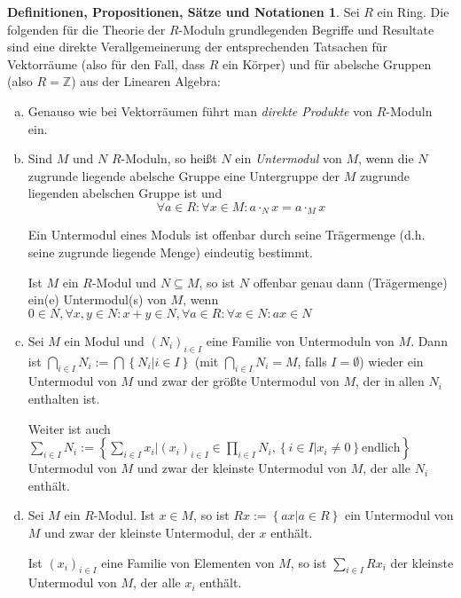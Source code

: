 \documentclass[
twoside=semi,
fontsize=12,
DIV=12, 
cleardoublepage=current,
leqno,
headings=optiontoheadandtoc, 
toc=idx
]{scrbook}
\newcommand{\Z}{\mathbb{Z}}
\newcommand{\set}[1]{\left\{ #1 \right\}}
\theoremstyle{definition}
\newtheorem{def-prop-satz-not}[definition]{Definitionen, Propositionen, S\"atze und Notationen}
\begin{document}
	\begin{def-prop-satz-not}\label{1.1.4}
		Sei $R$ ein Ring. Die folgenden f\"ur die Theorie der $R$-Moduln grundlegenden Begriffe und Resultate sind eine direkte Verallgemeinerung der entsprechenden Tatsachen f\"ur Vektorr\"aume (also f\"ur den Fall, dass $R$ ein K\"orper) und f\"ur abelsche Gruppen (also $R = \Z$) aus der Linearen Algebra:
		
		\begin{enumerate}[(a)]
			\item Genauso wie bei Vektorr\"aumen f\"uhrt man \emph{direkte Produkte} von $R$-Moduln ein.
			
			\item Sind $M$ und $N$ $R$-Moduln, so hei\ss t $N$ ein \emph{Untermodul} von $M$, wenn die $N$ zugrunde liegende abelsche Gruppe eine Untergruppe der $M$ zugrunde liegenden abelschen Gruppe ist und 
			\[\forall a \in R: \forall x \in M: a \cdot_N x = a \cdot_M x\]
			
			Ein Untermodul eines Moduls ist offenbar durch seine Tr\"agermenge (d.h. seine zugrunde liegende Menge) eindeutig bestimmt.
			
			Ist $M$ ein $R$-Modul und $N \subseteq M$, so ist $N$ offenbar genau dann (Tr\"agermenge) ein(e) Untermodul(s) von $M$, wenn $0\in N, \forall x, y\in N: x + y \in N, \forall a \in R: \forall x \in N: ax \in N$
			
			\item Sei $M$ ein Modul und $(N_i)_{i \in I}$ eine Familie von Untermoduln von $M$. Dann ist 
			$\bigcap_{i \in I} N_i := \bigcap \set{N_i | i \in I}$ (mit $\bigcap_{i \in I} N_i = M$, falls $I = \emptyset$)
			wieder ein Untermodul von $M$ und zwar der gr\"o\ss te Untermodul von $M$, der in allen $N_i$ enthalten ist.
			
			Weiter ist auch $\sum_{i \in I} N_i := \set{\sum_{i \in I} x_i | (x_i)_{i \in I} \in \prod_{i\in I} N_i, \set{i \in I| x_i \neq 0} \textrm{endlich}}$ Untermodul von $M$ und zwar der kleinste Untermodul von $M$, der alle $N_i$ enth\"alt.
			
			\item Sei $M$ ein $R$-Modul. Ist $x \in M$, so ist $Rx := \set{ax| a \in R}$ ein Untermodul von $M$ und zwar der kleinste Untermodul, der $x$ enth\"alt.
			
			Ist $(x_i)_{i \in I}$ eine Familie von Elementen von $M$, so ist $\sum_{i \in I} Rx_i$ der kleinste Untermodul von $M$, der alle $x_i$ enth\"alt.
			

\end{enumerate}
\end{def-prop-satz-not}
\end{document}
